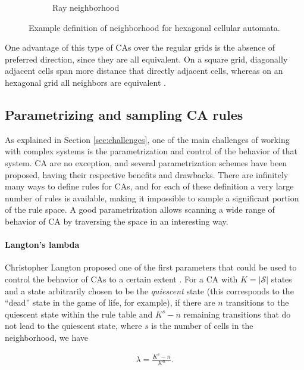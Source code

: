\begin{figure}[htbp]
\begin{subfigure}[b]{.35\linewidth}
    \caption{Ray neighborhood}
    \label{fig:hexagonal_2}
  \end{subfigure}
  \caption{Example definition of neighborhood for hexagonal cellular automata.}
\label{fig:hexagonal}
\end{figure}

One advantage of this type of \acp{CA} over the regular grids is the absence of
preferred direction, since they are all equivalent. On a square grid, diagonally
adjacent cells span more distance that directly adjacent cells, whereas on an
hexagonal grid all neighbors are equivalent
\parencite{moreeHexagonalSquareLattice2004}.

\subsection{Parametrizing and sampling CA rules}
As explained in Section \ref{sec:challenges}, one of the main challenges of
working with complex systems is the parametrization and control of the behavior
of that system. \ac{CA} are no exception, and several parametrization schemes
have been proposed, having their respective benefits and drawbacks. There are
infinitely many ways to define rules for \acp{CA}, and for each of these
definition a very large number of rules is available, making it impossible to
sample a significant portion of the rule space. A good parametrization allows
scanning a wide range of behavior of \ac{CA} by traversing the space in an
interesting way.

\paragraph{Langton's lambda\label{sec:langtons-lambda}}

Christopher Langton proposed one of the first parameters that could be used to
control the behavior of \acp{CA} to a certain extent
\parencite{langtonStudyingArtificialLife1986, langtonComputationEdgeChaos1990}.
For a \ac{CA} with $K = |\mathcal{S}|$ states and a state arbitrarily chosen to
be the \emph{quiescent} state (this corresponds to the ``dead'' state in the
game of life, for example), if there are $n$ transitions to the quiescent state
within the rule table and $K^{s} - n$ remaining transitions that do not lead to
the quiescent state, where $s$ is the number of cells in the neighborhood, we
have

\begin{equation}
  \label{eq:langton}
  \begin{aligned}
    \lambda = \frac{K^{s} - n}{K^{n}}.
  \end{aligned}
\end{equation}

